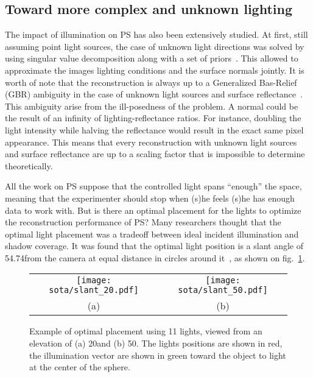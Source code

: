 \subsection{Toward more complex and unknown lighting}
The impact of illumination on PS has also been extensively studied. At first, still assuming point light sources, the case of unknown light directions was solved by using singular value decomposition along with a set of priors~\cite{Hayakawa1994}. This allowed to approximate the images lighting conditions and the surface normals jointly. It is worth of note that the reconstruction is always up to a Generalized Bas-Relief (GBR) ambiguity in the case of unknown light sources and surface reflectance~\cite{Belhumeur1999}. This ambiguity arise from the ill-posedness of the problem. A normal could be the result of an infinity of lighting-reflectance ratios. For instance, doubling the light intensity while halving the reflectance would result in the exact same pixel appearance. This means that every reconstruction with unknown light sources and surface reflectance are up to a scaling factor that is impossible to determine theoretically.

All the work on PS suppose that the controlled light spans ``enough'' the space, meaning that the experimenter should stop when (s)he feels (s)he has enough data to work with. But is there an optimal placement for the lights to optimize the reconstruction performance of PS? Many researchers thought that the optimal light placement was a tradeoff between ideal incident illumination and shadow coverage. It was found that the optimal light position is a slant angle of 54.74\degree from the camera at equal distance in circles around it~\cite{spence-iwtas-03,drbohlav-iccv-05}, as shown on fig.~\ref{fig:sota-optimalplacement}.

\begin{figure}
\centering
\begin{tabular}{cc}
\texttt{[image: sota/slant\_20.pdf]} &
\texttt{[image: sota/slant\_50.pdf]} \\
(a) & (b)
\end{tabular}
\caption{Example of optimal placement using 11 lights, viewed from an elevation of (a) 20\degree and (b) 50\degree. The lights positions are shown in red, the illumination vector are shown in green toward the object to light at the center of the sphere.}
\label{fig:sota-optimalplacement}
\end{figure}

